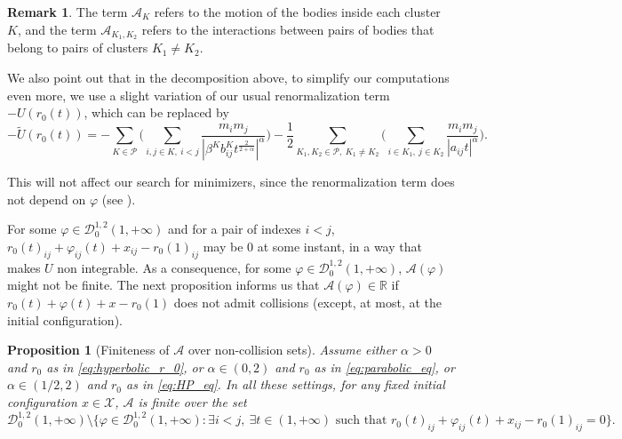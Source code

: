 \documentclass[a4paper,10pt]{amsart}
\theoremstyle{plain}
\newtheorem{prop}[thm]{Proposition}
\theoremstyle{definition}
\newtheorem{rem}[thm]{Remark}
\numberwithin{equation}{section}
\numberwithin{thm}{section}
\begin{document}
\begin{rem}
The term $\mathcal{A}_K$ refers to the motion of the bodies inside each cluster $K$, and the term $\mathcal{A}_{K_1,K_2}$ refers to the interactions between pairs of bodies that belong to pairs of clusters $K_1\ne K_2$.

{We also point out that in the decomposition above, to simplify our computations even more, we use a slight variation of our usual renormalization term $-U(r_0(t))$, which can be replaced by
    \[
    -\tilde{U}(r_0(t)) = -\sum_{K\in\mathcal{P}} \bigg(\sum_{i,j\in K,\ i<j} \frac{m_i m_j}{|\beta^K b_{ij}^K t^{\frac{2}{2+\alpha}}|^\alpha}\bigg) - \frac{1}{2}\sum_{K_1,K_2\in\mathcal{P},\ K_1\neq K_2} \bigg(\sum_{i\in K_1,\ j\in K_2} \frac{m_i m_j}{|a_{ij}t|^\alpha}\bigg).
    \]}
\end{rem}
This will not affect our search for minimizers, since the renormalization term does not depend on $\varphi$ (see \cite[Section 5]{PolimeniTerracini}).

For some $\varphi \in \mathcal{D}^{1,2}_0(1,+\infty)$ and for a pair of indexes $i<j$, $r_0(t)_{ij}+\varphi_{ij}(t)+x_{ij}-r_0(1)_{ij}$ may be $0$ at some instant, in a way that makes $U$ non integrable. As a consequence, for some $\varphi \in \mathcal{D}^{1,2}_0(1,+\infty)$, $\mathcal{A}(\varphi)$ might not be finite. The next proposition informs us that $\mathcal{A}(\varphi)\in \mathbb R$ if $r_0(t)+\varphi(t)+x-r_0(1)$ does not admit collisions (except, at most, at the initial configuration).

\begin{prop}[Finiteness of $\mathcal{A}$ over non-collision sets]
\label{prop:well-posedness}
Assume either $\alpha >0$ and 
$r_0$ as in \eqref{eq:hyperbolic_r_0}, or $\alpha \in (0,2)$ and $r_0$ as in \eqref{eq:parabolic_eq}, or $\alpha \in (1/2,2)$ and $r_0$ as in \eqref{eq:HP_eq}. In all these settings, for any fixed initial configuration $x\in\mathcal{X}$, $\mathcal A$ is finite over the set
\[
\mathcal{D}_0^{1,2}(1,+\infty) \setminus \{\varphi\in\mathcal{D}_0^{1,2}(1,+\infty):\exists i<j,\ \exists t\in (1,+\infty)  \text{ such that } r_0(t)_{ij}+\varphi_{ij}(t)+x_{ij}-r_0(1)_{ij}=0\}.
\]
\end{prop}
\end{document}
